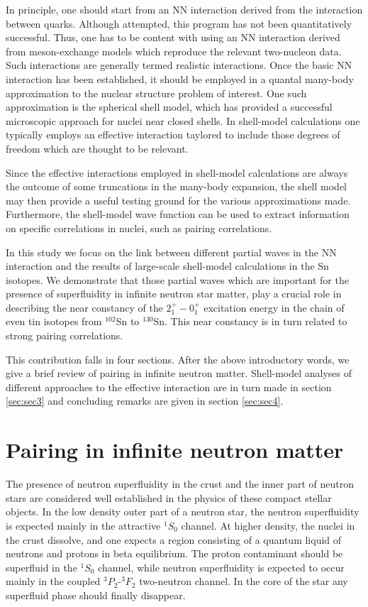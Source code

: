 \documentclass{ws-p9-75x6-50}
\begin{document}
In principle, one should start from an NN interaction derived from the interaction between quarks. 
Although attempted, this program has not been quantitatively successful. Thus, one has to be 
content with using an NN interaction derived from meson-exchange models which reproduce the 
relevant two-nucleon data. Such interactions are generally termed realistic interactions. 
Once the basic NN interaction has been established, it should be employed in a quantal 
many-body approximation to the nuclear structure problem of interest. 
One such approximation 
is the spherical shell model, which has provided a successful microscopic approach for nuclei 
near closed shells. In shell-model calculations one typically employs an effective interaction
taylored to include those degrees of freedom which are thought to be relevant. 

Since the effective interactions employed in shell-model calculations 
are always the outcome of some truncations in the many-body expansion,
the shell model may then provide a useful testing ground for 
the various approximations made. Furthermore, the shell-model wave function
can be used to extract information on specific correlations in nuclei, such as
pairing correlations. 

In this study we focus on the link between different partial waves in the
NN interaction and the results of large-scale shell-model calculations
in the Sn isotopes. We 
demonstrate that those partial waves which are important for the 
presence of superfluidity in infinite neutron star matter, play a crucial role in describing
the  near constancy of the 
$2^+_1-0^+_1$ excitation energy in the chain
of even tin isotopes from 
$^{102}$Sn to $^{130}$Sn. This near constancy    
is in turn related to strong pairing correlations.  

This contribution falls in four sections. After the above introductory words, we give a 
brief review of pairing in infinite neutron matter. Shell-model
analyses of different approaches to the effective interaction are in turn made in section
\ref{sec:sec3} and concluding remarks 
are given in section \ref{sec:sec4}.
\section{Pairing in infinite neutron matter}\label{sec:sec2}

The presence of neutron superfluidity in 
the crust and the inner part 
of neutron stars 
are considered well established 
in the physics of these compact stellar objects. 
In the low density outer part of a neutron star, 
the neutron superfluidity is expected 
mainly in the attractive $^1S_0$ channel. 
At higher density, the nuclei in the crust dissolve, and one 
expects a region consisting of a quantum liquid of neutrons and 
protons in beta equilibrium. 
The proton contaminant should be superfluid 
in the $^1S_0$ channel, while neutron superfluidity is expected to  
occur mainly in the coupled $^3P_2$-$^3F_2$ two-neutron channel. 
In the core of the star any superfluid 
phase should finally disappear.
 
\end{document}
